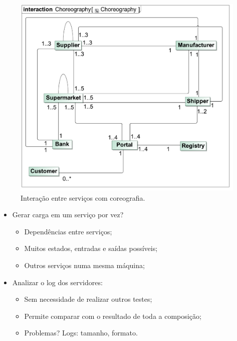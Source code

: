\documentclass{beamer}
\begin{document}
\begin{frame}
\begin{figure}
\includegraphics[height=0.85\textheight,clip=true,trim=2mm 10mm 5mm 14mm]{figures/chor}
\caption{Interação entre serviços com coreografia.}
\end{figure}
\end{frame}

\begin{frame}
\begin{itemize}
  \item Gerar carga em um serviço por vez?
  \begin{itemize}
    \item Dependências entre serviços;
    \item Muitos estados, entradas e saídas possíveis;
    \item Outros serviços numa mesma máquina;
  \end{itemize}
  \item Analizar o log dos servidores:
  \begin{itemize}
    \item Sem necessidade de realizar outros testes;
    \item Permite comparar com o resultado de toda a composição;
    \item Problemas? Logs: tamanho, formato.
  \end{itemize}
\end{itemize}
\end{frame}
\end{document}
